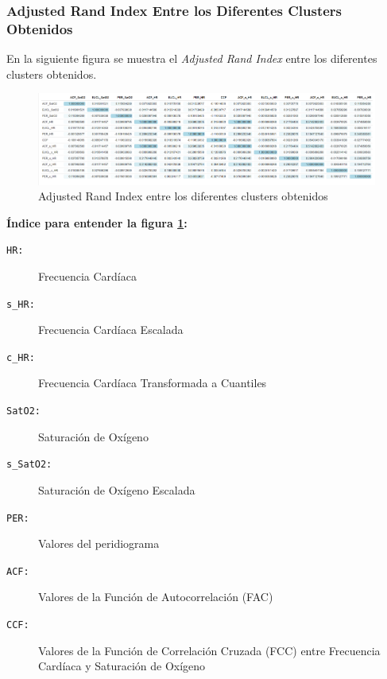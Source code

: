 \newpage
\thispagestyle{empty}
\begin{landscape}

\subsubsection{Adjusted Rand Index Entre los Diferentes Clusters Obtenidos}

En la siguiente figura se muestra el \textit{Adjusted Rand Index} entre los diferentes clusters obtenidos. 

\begin{figure}[H]
    \centering
    \includegraphics[scale=0.65]{img/adj-rand-index.png}
    \caption{Adjusted Rand Index entre los diferentes clusters obtenidos}
    \label{fig:Adj-Rand-Index}
\end{figure}

\textbf{Índice para entender la figura \ref{fig:Adj-Rand-Index}:}
\begin{description}
  \item[\texttt{HR:}] Frecuencia Cardíaca
  \item[\texttt{s\_HR:}] Frecuencia Cardíaca Escalada
  \item[\texttt{c\_HR:}] Frecuencia Cardíaca Transformada a Cuantiles
  \item[\texttt{SatO2:}] Saturación de Oxígeno
  \item[\texttt{s\_SatO2:}] Saturación de Oxígeno Escalada
  \item[\texttt{PER:}] Valores del peridiograma
  \item[\texttt{ACF:}] Valores de la Función de Autocorrelación (FAC)
  \item[\texttt{CCF:}] Valores de la Función de Correlación Cruzada (FCC) entre Frecuencia Cardíaca y Saturación de Oxígeno
\end{description}


\end{landscape}
\restoregeometry



